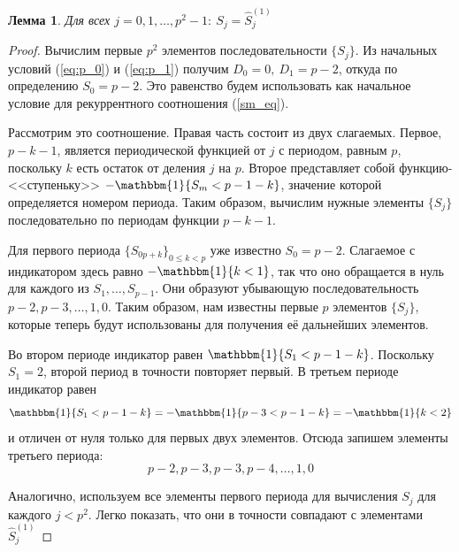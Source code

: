 \documentclass[14pt, a4paper, russian]{report}
\newtheorem{lemma}{\indent Лемма}
\begin{document}
\begin{lemma}\label{sm1}
Для всех $j = 0, 1, \ldots, p^2-1:\ S_j=\hat{S}_j^{(1)}$
\end{lemma}
\begin{proof}
Вычислим первые $p^2$ элементов последовательности $\{S_j\}$. Из начальных условий (\ref{eq:p_0}) и (\ref{eq:p_1}) получим $D_0 = 0,\ D_1 = p-2$, откуда по определению $S_0 = p-2$. Это равенство будем использовать как начальное условие для рекуррентного соотношения (\ref{sm_eq}).

Рассмотрим это соотношение. Правая часть состоит из двух слагаемых. Первое, $p-k-1$, является периодической функцией от $j$ с периодом, равным $p$, поскольку $k$ есть остаток от деления $j$ на $p$. Второе представляет собой функцию-<<ступеньку>> $-\mathbbm{1}\{S_m < p-1-k\}$, значение которой определяется номером периода. Таким образом, вычислим нужные элементы $\{S_j\}$ последовательно по периодам функции $p-k-1$.

Для первого периода $\{S_{0p+k}\}_{0 \le k < p}$ уже известно $S_0=p-2$. Слагаемое с индикатором здесь равно $-\mathbbm{1}\{k < 1\}$, так что оно обращается в нуль для каждого из $S_1, \ldots, S_{p-1}$. Они образуют убывающую последовательность $p-2, p-3, \ldots, 1, 0$. Таким образом, нам известны первые $p$ элементов $\{S_j\}$, которые теперь будут использованы для получения её дальнейших элементов.

Во втором периоде индикатор равен $\mathbbm{1}\{S_1 < p-1-k\}$. Поскольку $S_1=2$, второй период в точности повторяет первый. В третьем периоде индикатор равен $$\mathbbm{1}\{S_1 < p-1-k\}=-\mathbbm{1}\{p-3 < p-1-k\} = -\mathbbm{1}\{k < 2\}$$ и отличен от нуля только для первых двух элементов. Отсюда запишем элементы третьего периода: $$p-2,p-3,p-3,p-4, \ldots, 1, 0$$

Аналогично, используем все элементы первого периода для вычисления $S_j$ для каждого $j < p^2$. 
Легко показать, что они в точности совпадают с элементами $\hat{S}_j^{(1)}$
\end{proof}
\end{document}
